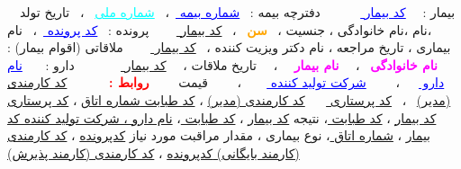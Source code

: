 \documentclass{article}
\begin{document}
  بیمار   : 
  \textcolor{blue}{\underline{کد بیمار }}
  \newline 
  \newline
 دفترچه بیمه  : 
 \textcolor{blue}{\underline{شماره بیمه }}
 ، 
 \textcolor{cyan}{\underline{شماره ملی} }
 ،‌
 تاریخ تولد  ،‌نام ،‌نام خانوادگی  ،‌ جنسیت ، 
 \textcolor{orange}{\textbf{سن} }
 ،
 \underline{کد بیمار }
 \newline
 \newline
 پرونده  ‌:‌
 \textcolor{blue}{\underline{کد پرونده }}
 ،
 نام بیماری ، تاریخ مراجعه  ،‌ نام دکتر ویزیت کننده ،
 \underline{کد بیمار }
 \newline 
 \newline
 ملاقاتی  (اقوام بیمار) : 
 \textcolor{magenta}{\textbf{نام خانوادگی }}
 ، 
  \textcolor{magenta}{\textbf{نام بیمار }}
  ،‌
  تاریخ ملاقات  ،‌ 
  \underline{کد بیمار }
  \newline
  \newline
  دارو : 
   \textcolor{blue}{\underline{نام دارو  }}
   ،
    \textcolor{blue}{\underline{شرکت تولید کننده  }}
    ، 
    قیمت 
\newline
\newline
    \textcolor{red}{\textbf{روابط : }}
 \newline
 \newline
 \underline{کد کارمندی (مدیر)}
 ، 
 \underline{کد پرستاری }
 \newline
 \newline
{}
\underline{کد کارمندی (مدیر)}
، 
\underline{کد طبابت  }
\newline
\newline
{}
\underline{شماره اتاق}
، 
\underline{کد پرستاری }
\newline
\newline
{}
\underline{کد بیمار}
، 
\underline{کد طبابت }
، نتیجه 
\newline
\newline
{}
\underline{کد بیمار}
، 
\underline{کد طبابت }
،
\underline{نام دارو ، شرکت  تولید کننده }
\newline
\newline
{}
\underline{کد بیمار}
، 
\underline{شماره اتاق  }
، 
نوع بیماری  ،‌ مقدار مراقبت مورد نیاز 
\newline
\newline
{}
\underline{کدپرونده}
، 
\underline{کد کارمندی (کارمند بایگانی) }
\newline
\newline
{}
\underline{کدپرونده}
، 
\underline{کد کارمندی (کارمند پذیرش) }
\end{document}
